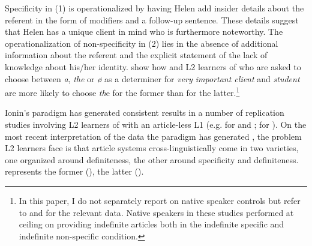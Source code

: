 \documentclass[output=paper,
modfonts
]{langscibook}
\begin{document}
Specificity in (1) is operationalized by having Helen add insider details about the referent in the form of modifiers and a follow-up sentence. These details suggest that Helen has a unique client in mind who is furthermore noteworthy. The operationalization of non-specificity in (2) lies in the absence of additional information about the referent and the explicit statement of the lack of knowledge about his/her identity. \citet{IoninKoWexler2004} show how  and  L2 learners of  who are asked to choose between \textit{a}, \textit{the} or \textit{ø} as a determiner for \textit{very important client} and \textit{student} are more likely to choose \textit{th}e for the former than for the latter.\footnote{In this paper, I do not separately report on native speaker controls but refer to \citet{IoninKoWexler2004} and \citet{LeBruynDong2017S,LeBruynDong2017T} for the relevant data. Native speakers in these studies performed at ceiling on providing indefinite articles both in the indefinite specific and indefinite non-specific condition.} 

Ionin’s paradigm has generated consistent results in a number of replication studies involving L2 learners of  with an article-less L1 (e.g. \citealt{KoIoninWexler2010} for  and ; \citealt{Hawkinsetal2006} for ). On the most recent interpretation of the data the paradigm has generated \citep{IoninZubizarretaPhilippov2009}, the problem L2 learners face is that article systems cross-linguistically come in two varieties, one organized around definiteness, the other around specificity and definiteness.  represents the former (),  the latter (). 
\end{document}
